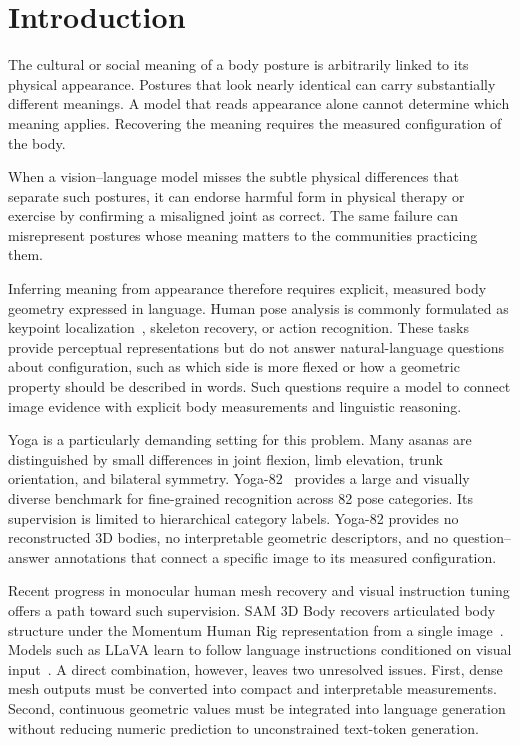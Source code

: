 \section{Introduction}
\label{sec:intro}

The cultural or social meaning of a body posture is arbitrarily linked to its physical appearance.
Postures that look nearly identical can carry substantially different meanings.
A model that reads appearance alone cannot determine which meaning applies.
Recovering the meaning requires the measured configuration of the body.

When a vision--language model misses the subtle physical differences that separate such postures, it can endorse harmful form in physical therapy or exercise by confirming a misaligned joint as correct.
The same failure can misrepresent postures whose meaning matters to the communities practicing them.

Inferring meaning from appearance therefore requires explicit, measured body geometry expressed in language.
Human pose analysis is commonly formulated as keypoint localization~\cite{cao2019openpose,sun2019deep}, skeleton recovery, or action recognition.
These tasks provide perceptual representations but do not answer natural-language questions about configuration, such as which side is more flexed or how a geometric property should be described in words.
Such questions require a model to connect image evidence with explicit body measurements and linguistic reasoning.

Yoga is a particularly demanding setting for this problem.
Many asanas are distinguished by small differences in joint flexion, limb elevation, trunk orientation, and bilateral symmetry.
Yoga-82~\cite{verma2020yoga82} provides a large and visually diverse benchmark for fine-grained recognition across 82 pose categories.
Its supervision is limited to hierarchical category labels.
Yoga-82 provides no reconstructed 3D bodies, no interpretable geometric descriptors, and no question--answer annotations that connect a specific image to its measured configuration.

Recent progress in monocular human mesh recovery and visual instruction tuning offers a path toward such supervision.
SAM 3D Body recovers articulated body structure under the Momentum Human Rig representation from a single image~\cite{yang2026sam3dbody}.
Models such as LLaVA learn to follow language instructions conditioned on visual input~\cite{liu2023visual}.
A direct combination, however, leaves two unresolved issues.
First, dense mesh outputs must be converted into compact and interpretable measurements.
Second, continuous geometric values must be integrated into language generation without reducing numeric prediction to unconstrained text-token generation.

